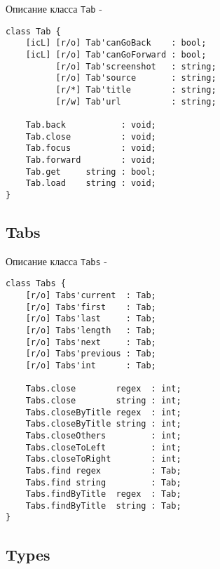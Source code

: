 \noindent Описание класса \texttt{Tab} -
\begin{verbatim}
class Tab {
    [icL] [r/o] Tab'canGoBack    : bool;
	[icL] [r/o] Tab'canGoForward : bool;
	      [r/o] Tab'screenshot   : string;
	      [r/o] Tab'source       : string;
	      [r/*] Tab'title        : string;
	      [r/w] Tab'url          : string;

    Tab.back           : void;
	Tab.close          : void;
	Tab.focus          : void;
	Tab.forward        : void;
	Tab.get     string : bool;
	Tab.load    string : void;
}
\end{verbatim}

\subsection{{\color{orange} Tabs}}

\noindent Описание класса \texttt{Tabs} -
\begin{verbatim}
class Tabs {
    [r/o] Tabs'current  : Tab;
	[r/o] Tabs'first    : Tab;
	[r/o] Tabs'last     : Tab;
	[r/o] Tabs'length   : Tab;
	[r/o] Tabs'next     : Tab;
	[r/o] Tabs'previous : Tab;
	[r/o] Tabs'int      : Tab;
	
    Tabs.close        regex  : int;
	Tabs.close        string : int;
	Tabs.closeByTitle regex  : int;
	Tabs.closeByTitle string : int;
	Tabs.closeOthers         : int;
	Tabs.closeToLeft         : int;
	Tabs.closeToRight        : int;
	Tabs.find regex          : Tab;
	Tabs.find string         : Tab;
	Tabs.findByTitle  regex  : Tab;
	Tabs.findByTitle  string : Tab;
}
\end{verbatim}

\subsection{{\color{orange} Types}}

